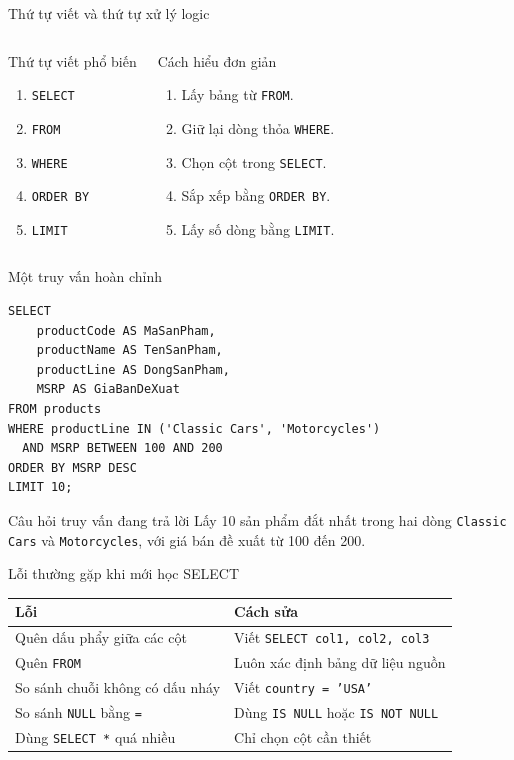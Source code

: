 \documentclass[aspectratio=169,11pt]{beamer}
\newcommand{\kw}[1]{\textcolor{sqlblue}{\texttt{#1}}}
\begin{document}
\begin{frame}{Thứ tự viết và thứ tự xử lý logic}
\begin{columns}[T]
\begin{block}{Thứ tự viết phổ biến}
\begin{enumerate}
  \item \kw{SELECT}
  \item \kw{FROM}
  \item \kw{WHERE}
  \item \kw{ORDER BY}
  \item \kw{LIMIT}
\end{enumerate}
\end{block}
\begin{block}{Cách hiểu đơn giản}
\begin{enumerate}
  \item Lấy bảng từ \kw{FROM}.
  \item Giữ lại dòng thỏa \kw{WHERE}.
  \item Chọn cột trong \kw{SELECT}.
  \item Sắp xếp bằng \kw{ORDER BY}.
  \item Lấy số dòng bằng \kw{LIMIT}.
\end{enumerate}
\end{block}
\end{columns}
\end{frame}

\begin{frame}[fragile]{Một truy vấn hoàn chỉnh}
\begin{lstlisting}
SELECT
    productCode AS MaSanPham,
    productName AS TenSanPham,
    productLine AS DongSanPham,
    MSRP AS GiaBanDeXuat
FROM products
WHERE productLine IN ('Classic Cars', 'Motorcycles')
  AND MSRP BETWEEN 100 AND 200
ORDER BY MSRP DESC
LIMIT 10;
\end{lstlisting}
\begin{block}{Câu hỏi truy vấn đang trả lời}
Lấy 10 sản phẩm đắt nhất trong hai dòng \texttt{Classic Cars} và \texttt{Motorcycles}, với giá bán đề xuất từ 100 đến 200.
\end{block}
\end{frame}

\begin{frame}{Lỗi thường gặp khi mới học SELECT}
\begin{center}
\begin{tabular}{p{}p{}}
\toprule
\textbf{Lỗi} & \textbf{Cách sửa} \\
\midrule
Quên dấu phẩy giữa các cột & Viết \texttt{SELECT col1, col2, col3} \\
Quên \kw{FROM} & Luôn xác định bảng dữ liệu nguồn \\
So sánh chuỗi không có dấu nháy & Viết \texttt{country = 'USA'} \\
So sánh \kw{NULL} bằng \texttt{=} & Dùng \kw{IS NULL} hoặc \kw{IS NOT NULL} \\
Dùng \kw{SELECT *} quá nhiều & Chỉ chọn cột cần thiết \\
\bottomrule
\end{tabular}
\end{center}
\end{frame}
\end{document}
